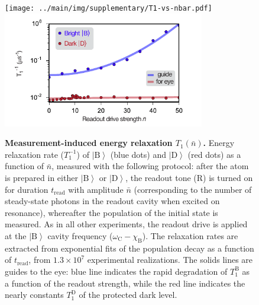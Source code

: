 \documentclass[
						superscriptaddress, 																 amsmath, amssymb,
		 aps,  prb,  
										floatfix,
		linenumbers,
			]{revtex4-1}
\newcommand{\ket}[1]{\left|#1\right>}
\newcommand{\B}{\ket{\mathrm{B}}}
\newcommand{\D}{\ket{\mathrm{D}}}
\begin{document}
\vspace{10em}

\begin{figure}[hbt]
\begin{centering}
\ifjournal
	\texttt{[image: ../main/img/supplementary/T1-vs-nbar.pdf]}
\else
	\includegraphics[width=88mm]{T1-vs-nbar.pdf}
\fi
\caption{\label{fig:T1-vs-nbar}
\textbf{Measurement-induced energy relaxation $T_1(\bar{n})$.}
Energy relaxation rate ($T_1^{-1}$) of $\B$ (blue dots) and $\D$ (red dots) as a function of $\bar{n}$, measured with the following protocol:
after the atom is prepared in either $\B$ or $\D$, the readout tone ($\mathrm R$) is turned on for duration $t_\mathrm{read}$ with amplitude $\bar{n}$ (corresponding to the number of steady-state photons in the readout cavity when excited on resonance), whereafter the population of the initial state is measured.
As in all other experiments, the readout drive is applied at the $\B$ cavity frequency ($\omega_\mathrm{C}-\chi_\mathrm{B}$).
The relaxation rates are extracted from exponential fits of the population decay as a function of $t_\mathrm{read}$, from $1.3\times10^7$ experimental realizations.
The solids lines are guides to the eye:
blue line indicates the rapid degradation of $T_1^\mathrm{B}$ as a function of the readout strength, while the red line indicates the nearly constants $T_1^\mathrm{D}$ of the protected dark level.
}
\end{centering}
\end{figure}
\end{document}

